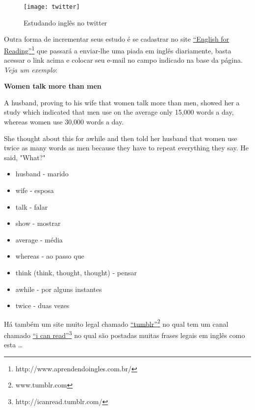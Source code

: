 \begin{figure}[h!]
	\centering
	\caption{\footnotesize Estudando inglês no twitter}
		\texttt{[image: twitter]}
\end{figure}

\noindent
Outra forma de incrementar seus estudo é se cadastrar no site
\href{http://www.aprendendoingles.com.br/}{``English for
Reading''}\footnote{http://www.aprendendoingles.com.br/} que passará
a enviar-lhe uma piada em inglês diariamente, basta acessar o link acima
e colocar seu e-mail no campo indicado na base da página. {\em Veja um exemplo}:

\vspace{0.3\baselineskip}
\begin{minipage}[b]{.8\linewidth}

	{\scriptsize
	\noindent
	{\bf Women talk more than men }

	A husband, proving to his wife that women talk more than men, showed her
	a study which indicated that men use on the average only 15,000 words a day,
	whereas women use 30,000 words a day.

	She thought about this for awhile and then told her husband that women use
	twice as many words as men because they have to repeat everything they say.
	He said, "What?"

	\begin{itemize}
		\item husband - marido
		\item wife - esposa
		\item talk - falar
		\item show - mostrar
		\item average - média
		\item whereas - ao passo que
		\item think (think, thought, thought) - pensar
		\item awhile - por alguns instantes
		\item twice - duas vezes
	\end{itemize}
	}
\end{minipage} \hfill

\vspace{0.3\baselineskip}
Há também um site muito legal chamado
\href{http://www.tumblr.com}{``tumblr''}\footnote{www.tumblr.com} no qual tem
um canal chamado \href{http://icanread.tumblr.com/}{``i can
read''}\footnote{http://icanread.tumblr.com/} no qual são postadas muitas
frases legais em inglês como esta \dots

